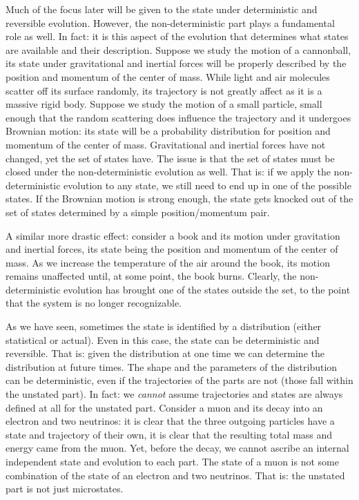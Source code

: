 \documentclass[aps,pra,10pt,twocolumn,floatfix,nofootinbib]{revtex4-1}
\theoremstyle{definition}
\begin{document}
Much of the focus later will be given to the state under deterministic and reversible evolution. However, the non-deterministic part plays a fundamental role as well. In fact: it is this aspect of the evolution that determines what states are available and their description. Suppose we study the motion of a cannonball, its state under gravitational and inertial forces will be properly described by the position and momentum of the center of mass. While light and air molecules scatter off its surface randomly, its trajectory is not greatly affect as it is a massive rigid body. Suppose we study the motion of a small particle, small enough that the random scattering does influence the trajectory and it undergoes Brownian motion: its state will be a probability distribution for position and momentum of the center of mass. Gravitational and inertial forces have not changed, yet the set of states have. The issue is that the set of states must be closed under the non-deterministic evolution as well. That is: if we apply the non-deterministic evolution to any state, we still need to end up in one of the possible states. If the Brownian motion is strong enough, the state gets knocked out of the set of states determined by a simple position/momentum pair.

A similar more drastic effect: consider a book and its motion under gravitation and inertial forces, its state being the position and momentum of the center of mass. As we increase the temperature of the air around the book, its motion remains unaffected until, at some point, the book burns. Clearly, the non-deterministic evolution has brought one of the states outside the set, to the point that the system is no longer recognizable.

As we have seen, sometimes the state is identified by a distribution (either statistical or actual). Even in this case, the state can be deterministic and reversible. That is: given the distribution at one time we can determine the distribution at future times. The shape and the parameters of the distribution can be deterministic, even if the trajectories of the parts are not (those fall within the unstated part). In fact: we \emph{cannot} assume trajectories and states are always defined at all for the unstated part. Consider a muon and its decay into an electron and two neutrinos: it is clear that the three outgoing particles have a state and trajectory of their own, it is clear that the resulting total mass and energy came from the muon. Yet, before the decay, we cannot ascribe an internal independent state and evolution to each part. The state of a muon is not some combination of the state of an electron and two neutrinos. That is: the unstated part is not just microstates.
\end{document}
